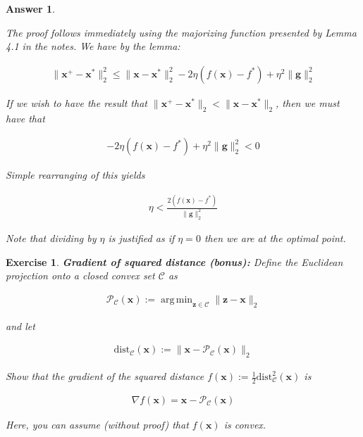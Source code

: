 \documentclass[12pt]{article}
\DeclareMathOperator*{\argmin}{arg\,min}
\theoremstyle{colon}
\newtheorem{exercise}{Exercise}
\newtheorem*{answer}{Answer}
\begin{document}
\begin{answer}
  \

  The proof follows immediately using the majorizing function presented by Lemma 4.1 in the notes. We have by the lemma:

  \begin{gather*}
    \lVert \bm{x}^+ - \bm{x}^* \rVert_2^2 \leq \lVert \bm{x} - \bm{x}^* \rVert_2^2 - 2 \eta (f(\bm{x}) - f^*) + \eta^2 \lVert \bm{g} \rVert_2^2
  \end{gather*}

  \noindent If we wish to have the result that $\lVert \bm{x}^+ - \bm{x}^* \rVert_2 < \lVert \bm{x} - \bm{x}^* \rVert_2$, then we must have that

  \begin{gather*}
    - 2 \eta (f(\bm{x}) - f^*) + \eta^2 \lVert \bm{g} \rVert_2^2 < 0
  \end{gather*}

  \noindent Simple rearranging of this yields

  \begin{gather*}
    \eta < \frac{2(f(\bm{x}) - f^*)}{\lVert \bm{g} \rVert_2^2}
  \end{gather*}

  \noindent Note that dividing by $\eta$ is justified as if $\eta = 0$ then we are at the optimal point.

\end{answer}

\clearpage

\begin{exercise}
  \textbf{Gradient of squared distance (bonus):} Define the Euclidean projection onto a closed convex set $\mathcal{C}$ as

  \begin{gather*}
    \mathcal{P}_\mathcal{C}(\bm{x}) := \argmin_{\bm{z} \in \mathcal{C}} \lVert \bm{z} - \bm{x} \rVert_2
  \end{gather*}

  \noindent and let

  \begin{gather*}
    \text{dist}_\mathcal{C} (\bm{x}) :=\lVert \bm{x} - \mathcal{P}_\mathcal{C} (\bm{x}) \rVert_2
  \end{gather*}

  \noindent Show that the gradient of the squared distance $f(\bm{x}) := \frac{1}{2} \text{dist}_\mathcal{C}^2 (\bm{x})$ is

  \begin{gather*}
    \nabla f(\bm{x}) = \bm{x} - \mathcal{P}_\mathcal{C} (\bm{x})
  \end{gather*}

  \noindent Here, you can assume (without proof) that $f(\bm{x})$ is convex.

\end{exercise}
\end{document}
